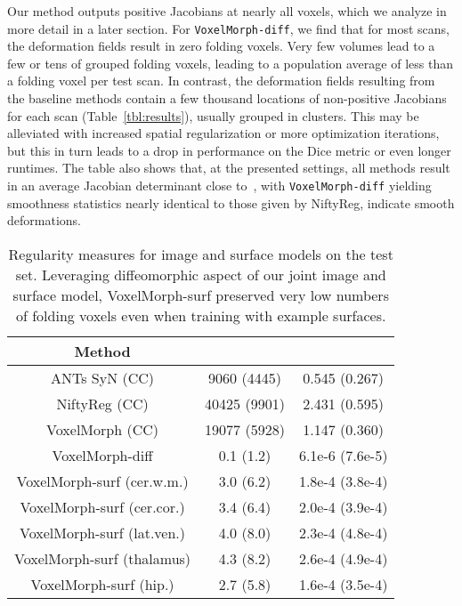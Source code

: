 \documentclass{article}
\newcommand{\algname}{{VoxelMorph}}
\begin{document}
Our method outputs positive Jacobians at nearly all voxels, which we analyze in more detail in a later section.{\color{blue} For \verb|VoxelMorph-diff|, we find that for most scans, the deformation fields result in zero folding voxels. Very few volumes lead to a few or tens of grouped folding	voxels, leading to a population average of less than a folding voxel per test scan.} {\color{blue} In contrast, the deformation fields resulting from the baseline methods contain a few thousand locations of non-positive Jacobians for each scan (Table~\ref{tbl:results}), usually grouped in clusters. This may be alleviated with increased spatial regularization or more optimization iterations, but this in turn leads to a drop in performance on the Dice metric or even longer runtimes. The table also shows that, at the presented settings, all methods result in an average Jacobian determinant close to~, with \verb|VoxelMorph-diff| yielding smoothness statistics nearly identical to those given by NiftyReg, indicate smooth deformations.}




























\begin{table}[tb!]
	\small
	\centering
	\begin{tabular}{c c c}
		\textbf{Method} &  & \\
		\hline
		\hline
		\rule{0pt}{1.1em}
		ANTs SyN (CC) &9060 (4445)& 0.545 (0.267)\\
		NiftyReg (CC) &40425 (9901)& 2.431 (0.595)\\
		\algname{} (CC)&19077 (5928) & 1.147 (0.360)\\
		\hline
		\rule{0pt}{1.1em}
		\algname{}-diff                     & 0.1 (1.2) & 6.1e-6 (7.6e-5)\\
		\algname{}-surf (cer.w.m.)     & 3.0 (6.2)&  1.8e-4 (3.8e-4)\\
		\algname{}-surf (cer.cor.)   & 3.4 (6.4) & 2.0e-4 (3.9e-4)\\
		\algname{}-surf (lat.ven.)     & 4.0 (8.0) & 2.3e-4 (4.8e-4)\\
		\algname{}-surf (thalamus)          & 4.3 (8.2) & 2.6e-4 (4.9e-4)\\
		\algname{}-surf (hip.)       & 2.7 (5.8) & 1.6e-4 (3.5e-4)\\
\hline
	\end{tabular}
	\vspace{0.1cm}
	\caption{Regularity measures for image and surface models on the test set. Leveraging diffeomorphic aspect of our joint image and surface model, VoxelMorph-surf preserved very low numbers of folding voxels even when training with example surfaces.}
	\label{tbl:jacobian-results}
\end{table}
\end{document}
